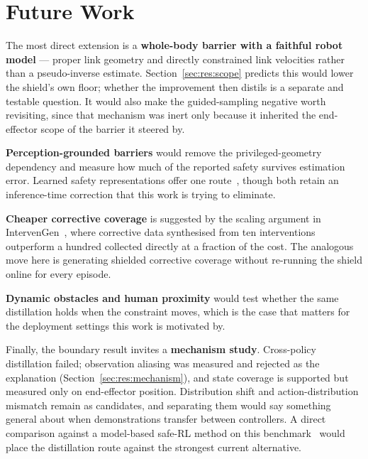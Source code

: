 \section{Future Work}\label{sec:disc:future}

The most direct extension is a \textbf{whole-body barrier with a faithful robot model} --- proper
link geometry and directly constrained link velocities rather than a pseudo-inverse estimate.
Section~\ref{sec:res:scope} predicts this would lower the shield's own floor; whether the
improvement then distils is a separate and testable question. It would also make the guided-sampling
negative worth revisiting, since that mechanism was inert only because it inherited the
end-effector scope of the barrier it steered by.

\textbf{Perception-grounded barriers} would remove the privileged-geometry dependency and measure
how much of the reported safety survives estimation error. Learned safety representations offer one
route~\cite{meng2024conbat,sun2025lpb}, though both retain an inference-time correction that this
work is trying to eliminate.

\textbf{Cheaper corrective coverage} is suggested by the scaling argument in
IntervenGen~\cite{hoque2024intervengen}, where corrective data synthesised from ten interventions
outperform a hundred collected directly at a fraction of the cost. The analogous move here is
generating shielded corrective coverage without re-running the shield online for every episode.

\textbf{Dynamic obstacles and human proximity} would test whether the same distillation holds when
the constraint moves, which is the case that matters for the deployment settings this work is
motivated by.

Finally, the boundary result invites a \textbf{mechanism study}. Cross-policy distillation failed;
observation aliasing was measured and rejected as the explanation
(Section~\ref{sec:res:mechanism}), and state coverage is supported but measured only on
end-effector position. Distribution shift and action-distribution mismatch remain as candidates,
and separating them would say something general about when demonstrations transfer between
controllers. A direct comparison against a model-based safe-RL method on this
benchmark~\cite{safedojo} would place the distillation route against the strongest current
alternative.
